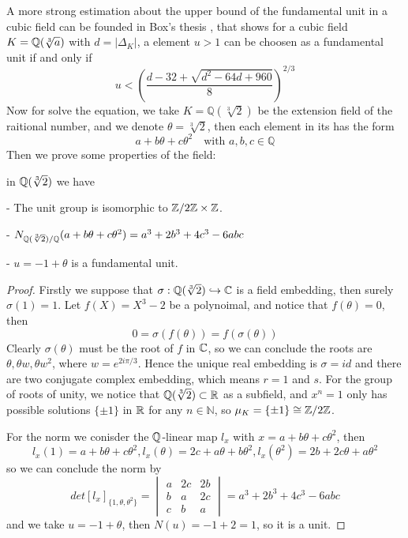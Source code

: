 A more strong estimation about the upper bound of the fundamental unit in a cubic field can be founded in Box's thesis \cite[Theorem 1.82]{box2014introduction}, that shows for a cubic field \(K = \mathbb{Q}(\sqrt[3]{a})\) with \(d = |\Delta_K|\), a element \(u>1\) can be choosen as a fundamental unit if and only if 
\[u < (\frac{d-32+\sqrt{d^2-64d+960}}{8})^{2/3}\]
Now for solve the equation, we take \(K = \mathbb{Q}(\sqrt[3]{2})\) be the extension field of the raitional number,  and we denote \(\theta = \sqrt[3]{2}\), then each element in its has the form
\[a+b\theta +c \theta^2 \quad  \text{with } a,b,c  \in \mathbb{Q}\]
Then we prove some properties of the field:
\begin{proposition}
    in \(\mathbb{Q}(\sqrt[3]{2})\) we have

    - The unit group is isomorphic to \(\mathbb{Z}/2\mathbb{Z} \times \mathbb{Z}\).

    - \(N_{\mathbb{Q}(\sqrt[3]{2}) / \mathbb{Q}}(a+b\theta+c\theta^2) = a^3+2b^3+4c^3-6abc\)

    - \(u = -1 + \theta \) is a fundamental unit.


    \begin{proof}
        Firstly we suppose that \(\sigma: \mathbb{Q}(\sqrt[3]{2}) \hookrightarrow  \mathbb{C} \) is a field embedding, then surely \(\sigma(1)=1\). Let \(f(X) = X^3-2\) be a polynoimal, and notice that \(f(\theta) = 0\), then
        \[0 = \sigma(f(\theta)) = f(\sigma(\theta))\]
        Clearly \(\sigma(\theta)\) must be the root of \(f\) in \(\mathbb{C}\), so we can conclude the roots are \(\theta, \theta w , \theta w^2\), where \(w = e^{2i\pi /3}\). Hence the unique real embedding is \(\sigma=id\) and there are two conjugate complex embedding, which means \(r=1\) and \(s\). For the group of roots of unity, we notice that \(\mathbb{Q}(\sqrt[3]{2}) \subset \mathbb{R}\) as a subfield, and \(x^n=1\) only has possible solutions \(\{\pm 1\}\) in \(\mathbb{R}\) for any \(n \in \mathbb{N}\), so \(\mu_K = \{\pm 1\} \cong \mathbb{Z}/2\mathbb{Z}\).

        For the norm we conisder the \(\mathbb{Q}\)-linear map \(l_x\) with \(x=a+b \theta + c \theta^2\), then
        \[l_x(1) = a+b \theta + c \theta^2, l_x(\theta )= 2c+a \theta + b \theta ^2, l_x(\theta ^2) = 2b+ 2c \theta + a \theta ^2 \]
        so we can conclude the norm by 
        \[det{[l_x]_{\{1,\theta,\theta ^2\}}} = \begin{vmatrix}
            a & 2c & 2b \\
            b & a & 2c \\
            c & b & a
        \end{vmatrix} = a^3+2b^3+4c^3-6abc\]
        and we take \(u= -1 + \theta\), then \(N(u) = -1+2=1\), so it is a unit.


\end{proof}
\end{proposition}
